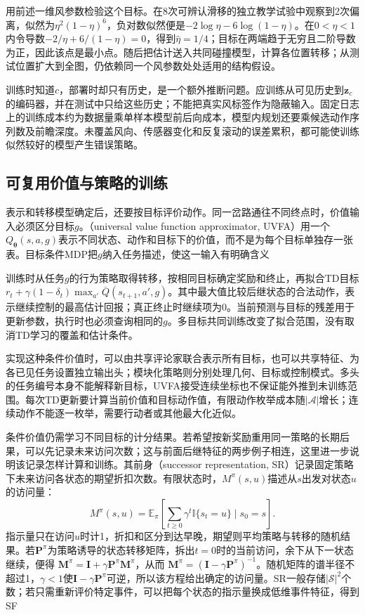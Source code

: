 用前述一维风参数检验这个目标。在8次可辨认滑移的独立教学试验中观察到2次偏离，似然为$\eta^2(1-\eta)^6$，负对数似然便是$-2\log\eta-6\log(1-\eta)$。在$0<\eta<1$内令导数$-2/\eta+6/(1-\eta)=0$，得到$\widehat\eta=1/4$；目标在两端趋于无穷且二阶导数为正，因此该点是最小点。随后把估计送入共同碰撞模型，计算各位置转移；从测试位置扩大到全图，仍依赖同一个风参数处处适用的结构假设。

训练时知道$c$，部署时却只有历史，是一个额外推断问题。应训练从可见历史到$\bm z_c$的编码器，并在测试中只给这些历史；不能把真实风标签作为隐蔽输入。固定日志上的训练成本约为数据量乘单样本模型前后向成本，模型内规划还要乘候选动作序列数及前瞻深度。未覆盖风向、传感器变化和反复滚动的误差累积，都可能使训练似然较好的模型产生错误策略。

\subsection{可复用价值与策略的训练}
\label{sec:rl-transfer-value-training}

表示和转移模型确定后，还要按目标评价动作。同一岔路通往不同终点时，价值输入必须区分目标$g$。（universal value function approximator, UVFA）用一个$Q_{\bm\theta}(s,a,g)$表示不同状态、动作和目标下的价值，而不是为每个目标单独存一张表。目标条件MDP把$g$纳入任务描述，使这一输入有明确含义

训练时从任务$g$的行为策略取得转移，按相同目标确定奖励和终止，再拟合TD目标$r_t+\gamma(1-\delta_t)\max_{a'}\overline Q(s_{t+1},a',g)$。其中最大值比较后继状态的合法动作，表示继续控制的最高估计回报；真正终止时继续项为0。当前预测与目标的残差用于更新参数，执行时也必须查询相同的$g$。多目标共同训练改变了拟合范围，没有取消TD学习的覆盖和估计条件。

实现这种条件价值时，可以由共享评论家联合表示所有目标，也可以共享特征、为各已见任务设置独立输出头；模块化策略则分别处理几何、目标或控制模式。多头的任务编号本身不能解释新目标，UVFA接受连续坐标也不保证能外推到未训练范围。每次TD更新要计算当前价值和目标动作值，有限动作枚举成本随$|\mathcal A|$增长；连续动作不能逐一枚举，需要行动者或其他最大化近似。

条件价值仍需学习不同目标的计分结果。若希望按新奖励重用同一策略的长期后果，可以先记录未来访问次数；这与前面后继特征的两步例子相连，这里进一步说明该记录怎样计算和训练。其前身（successor representation, SR）记录固定策略下未来访问各状态的期望折扣次数。有限状态时，$M^\pi(s,u)$描述从$s$出发对状态$u$的访问量：
\[
 M^\pi(s,u)=\mathbb E_\pi\!\left[\sum_{t\geq0}\gamma^t
       \mathbb I\{s_t=u\}\mid s_0=s\right].
\]
指示量只在访问$u$时计1，折扣和区分到达早晚，期望则平均策略与转移的随机结果。若$\bm P^\pi$为策略诱导的状态转移矩阵，拆出$t=0$时的当前访问，余下从下一状态继续，便得
$\bm M^\pi=\bm I+\gamma\bm P^\pi\bm M^\pi$，从而
$\bm M^\pi=(\bm I-\gamma\bm P^\pi)^{-1}$。随机矩阵的谱半径不超过1，$\gamma<1$使$\bm I-\gamma\bm P^\pi$可逆，所以该方程给出确定的访问量。SR一般存储$|\mathcal S|^2$个数；若只需重新评价特定事件，可以把每个状态的指示量换成低维事件特征，得到SF

